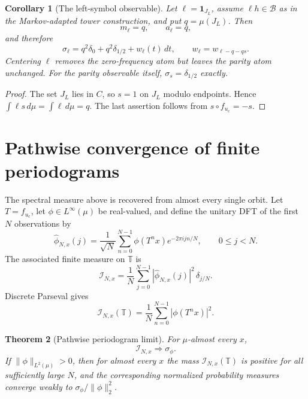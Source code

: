 \documentclass[11pt]{article}
\newtheorem{theorem}{Theorem}[section]
\newtheorem{corollary}[theorem]{Corollary}
\theoremstyle{definition}
\theoremstyle{remark}
\newcommand{\T}{\mathbb T}
\newcommand{\uc}{u_{\mathrm c}}
\newcommand{\cB}{\mathcal B}
\newcommand{\one}{\mathbf 1}
\newcommand{\weakto}{\mathop{\Longrightarrow}}
\begin{document}
\begin{corollary}[The left-symbol observable]\label{cor:left-symbol-spectrum}
Let $\ell=\one_{J_L}$, assume $\ell h\in\cB$ as in the Markov-adapted tower construction, and put $q=\mu(J_L)$.  Then
\[
    m_\ell=q,
    \qquad a_\ell=q,
\]
and therefore
\begin{equation}\label{eq:left-symbol-spectrum}
    \sigma_\ell=q^2\delta_0+q^2\delta_{1/2}
      +w_\ell(t)\,dt,
    \qquad w_\ell=w_{\ell-q-qs}.
\end{equation}
Centering $\ell$ removes the zero-frequency atom but leaves the parity atom unchanged.  For the parity observable itself, $\sigma_s=\delta_{1/2}$ exactly.
\end{corollary}

\begin{proof}
The set $J_L$ lies in $C$, so $s=1$ on $J_L$ modulo endpoints.  Hence $\int\ell s\,d\mu=\int\ell\,d\mu=q$.  The last assertion follows from $s\circ f_{\uc}=-s$.
\end{proof}

\section{Pathwise convergence of finite periodograms}

The spectral measure above is recovered from almost every single orbit.  Let $T=f_{\uc}$, let $\phi\in L^\infty(\mu)$ be real-valued, and define the unitary DFT of the first $N$ observations by
\begin{equation}\label{eq:orbit-dft}
    \widehat\phi_{N,x}(j)
    =\frac1{\sqrt N}\sum_{n=0}^{N-1}
      \phi(T^nx)e^{-2\pi ijn/N},
    \qquad 0\le j<N.
\end{equation}
The associated finite measure on $\T$ is
\begin{equation}\label{eq:orbit-periodogram}
    \mathcal I_{N,x}
    =\frac1N\sum_{j=0}^{N-1}
      |\widehat\phi_{N,x}(j)|^2\,\delta_{j/N}.
\end{equation}
Discrete Parseval gives
\begin{equation}\label{eq:periodogram-mass}
    \mathcal I_{N,x}(\T)
    =\frac1N\sum_{n=0}^{N-1}|\phi(T^nx)|^2.
\end{equation}

\begin{theorem}[Pathwise periodogram limit]\label{thm:pathwise-periodogram}
For $\mu$-almost every $x$,
\begin{equation}\label{eq:pathwise-weak-limit}
    \mathcal I_{N,x}\weakto\sigma_\phi.
\end{equation}
If $\|\phi\|_{L^2(\mu)}>0$, then for almost every $x$ the mass $\mathcal I_{N,x}(\T)$ is positive for all sufficiently large $N$, and the corresponding normalized probability measures converge weakly to $\sigma_\phi/\|\phi\|_2^2$.
\end{theorem}
\end{document}
